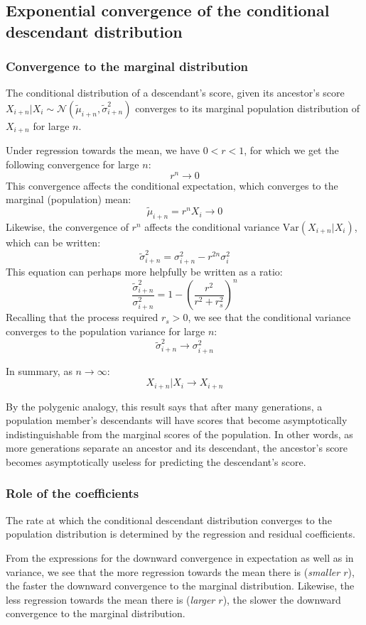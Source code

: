 \documentclass[a4paper,11pt]{article} %
\begin{document}
\subsection{Exponential convergence of the conditional descendant distribution}

\subsubsection*{Convergence to the marginal distribution}
The conditional distribution of a descendant's score, given its ancestor's score $X_{i+n}|X_i \sim \mathcal{N}( \tilde{\mu}_{i+n}, \tilde{\sigma}_{i+n}^2)$ converges to its marginal population distribution of $X_{i+n}$ for large $n$.

Under regression towards the mean, we have $0 < r < 1$, for which we get the following convergence for large $n$:
$$r^n \rightarrow 0$$
This convergence affects the conditional expectation, which converges to the marginal (population) mean:
$$\tilde{\mu}_{i+n} = r^nX_i \rightarrow 0$$
Likewise, the convergence of $r^n$ affects the conditional variance $\mathrm{Var}(X_{i+n}|X_i)$, which can be written:
$$\tilde{\sigma}_{i+n}^2 = \sigma_{i+n}^2 - r^{2n} \sigma_i^2$$
This equation can perhaps more helpfully be written as a ratio:
$$\frac{\tilde{\sigma}_{i+n}^2}{\sigma_{i+n}^2} = 1 - (\frac{r^2}{r^2+r_s^2})^n$$
Recalling that the process required $r_s > 0$, we see that the conditional variance converges to the population variance for large $n$:
$$\tilde{\sigma}_{i+n}^2 \rightarrow \sigma_{i+n}^2$$

In summary, as $n \rightarrow \infty$:
$$X_{i+n}|X_i \rightarrow X_{i+n}$$

By the polygenic analogy, this result says that after many generations, a population member's descendants will have scores that become asymptotically indistinguishable from the marginal scores of the population. In other words, as more generations separate an ancestor and its descendant, the ancestor's score becomes asymptotically useless for predicting the descendant's score.


\subsubsection*{Role of the coefficients}
The rate at which the conditional descendant distribution converges to the population distribution is determined by the regression and residual coefficients. 

From the expressions for the downward convergence in expectation as well as in variance, we see that the more regression towards the mean there is (\emph{smaller $r$}), the faster the downward convergence to the marginal distribution. Likewise, the less regression towards the mean there is (\emph{larger $r$}), the slower the downward convergence to the marginal distribution. 
\end{document}
